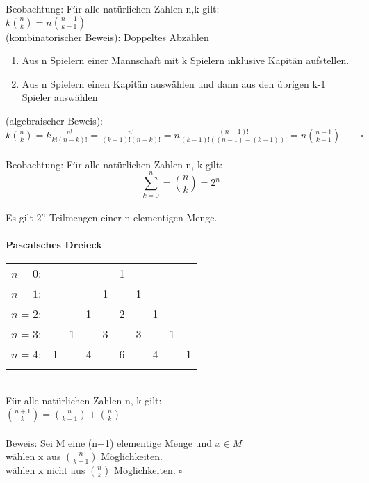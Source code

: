 \documentclass{scrartcl}\usepackage[utf8]{inputenc}
\begin{document}
Beobachtung: F\"ur alle nat\"urlichen Zahlen n,k gilt:\\
$k \binom{n}{k} = n \binom{n-1}{k-1}$\\
(kombinatorischer Beweis): Doppeltes Abz\"ahlen\\
  \begin{enumerate}
    	\item Aus n Spielern einer Mannschaft mit k Spielern inklusive Kapit\"an aufstellen.
    	\item Aus n Spielern einen Kapit\"an ausw\"ahlen und dann aus den \"ubrigen k-1 Spieler ausw\"ahlen
    \end{enumerate}
(algebraischer Beweis):\\
$k \binom{n}{k} = k \frac{n!}{k!(n-k)!} = \frac{n!}{(k-1)!(n-k)!} = n\frac{(n-1)!}{(k-1)!((n-1)-(k-1))!} = n \binom{n-1}{k-1} \qquad \square $ \\
\\
Beobachtung: F\"ur alle nat\"urlichen Zahlen n, k gilt: \\
\[ \sum_{k=0}^n =\binom{n}{k} = 2^n \]\\
Es gilt $2^n$ Teilmengen einer n-elementigen Menge.\\
\\
\textbf{Pascalsches Dreieck}\\
\begin{tabular}{rccccccccc}
$n=0$:&    &    &    &    &  1\\\noalign{\smallskip\smallskip}
$n=1$:&    &    &    &  1 &    &  1\\\noalign{\smallskip\smallskip}
$n=2$:&    &    &  1 &    &  2 &    &  1\\\noalign{\smallskip\smallskip}
$n=3$:&    &  1 &    &  3 &    &  3 &    &  1\\\noalign{\smallskip\smallskip}
$n=4$:&  1 &    &  4 &    &  6 &    &  4 &    &  1\\\noalign{\smallskip\smallskip}
\end{tabular}
\\
F\"ur alle nat\"urlichen Zahlen n, k gilt: \\
$\binom{n+1}{k}= \binom{n}{k-1}+\binom{n}{k}$\\
\\
Beweis: Sei M eine (n+1) elementige Menge und $x \in M $\\
w\"ahlen x aus $\binom{n}{k-1}$ M\"oglichkeiten.\\
w\"ahlen x nicht aus $\binom{n}{k}$ M\"oglichkeiten. \qquad $\square$\\
\end{document}
